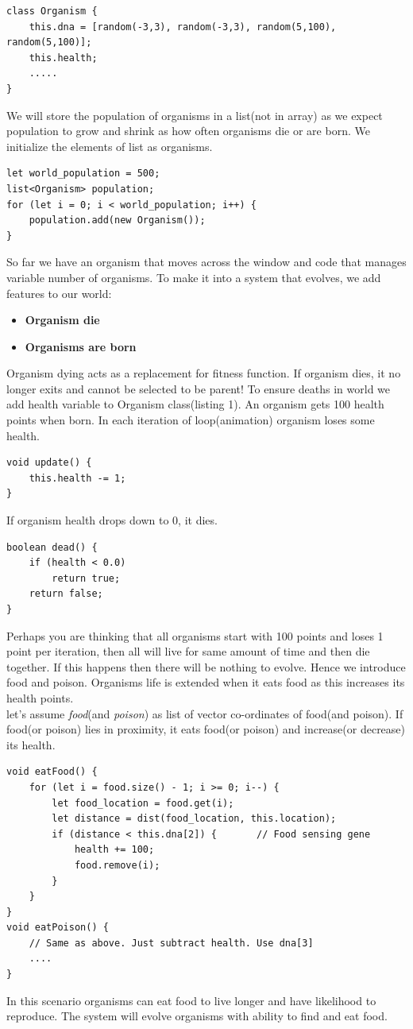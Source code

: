 \documentclass[conference]{IEEEtran}
\begin{document}
\begin{lstlisting}[caption = DNA of Organism]
class Organism {
	this.dna = [random(-3,3), random(-3,3), random(5,100), random(5,100)];
	this.health;
	.....
}
\end{lstlisting}
We will store the population of organisms in a list(not in array) as we expect population to grow and shrink as how often organisms die or are born. We initialize the elements of list as organisms.
\begin{lstlisting}[caption = Making initial population of organisms]
let world_population = 500;
list<Organism> population;
for (let i = 0; i < world_population; i++) {
	population.add(new Organism());
}
\end{lstlisting}
So far we have an organism that moves across the window and code that manages variable number of organisms. To make it into a system that evolves, we add features to our world:
\begin{itemize}
\item \textbf{Organism die}
\item \textbf{Organisms are born}
\end{itemize}
Organism dying acts as a replacement for fitness function. If organism dies, it no longer exits and cannot be selected to be parent! To ensure deaths in world we add health variable to Organism class(listing 1). An organism gets 100 health points when born. In each iteration of loop(animation) organism loses some health.
\begin{lstlisting}[caption = Updating death variable]
void update() {
	this.health -= 1;
}
\end{lstlisting}
If organism health drops down to 0, it dies.
\begin{lstlisting}[caption = Function in organism class to test if dead or not]
boolean dead() {
	if (health < 0.0) 
		return true;	
	return false;
}
\end{lstlisting}
Perhaps you are thinking that all organisms start with 100 points and loses 1 point per iteration, then all will live for same amount of time and then die together. If this happens then there will be nothing to evolve. Hence we introduce food and poison. Organisms life is extended when it eats food as this increases its health points.\\
let's assume \textit{food}(and \textit{poison}) as list of vector co-ordinates of food(and poison). If food(or poison) lies in proximity, it eats food(or poison) and increase(or decrease) its health.
\begin{lstlisting}[caption = Eating food and poison]
void eatFood() {
	for (let i = food.size() - 1; i >= 0; i--) {
		let food_location = food.get(i);
		let	distance = dist(food_location, this.location);
		if (distance < this.dna[2]) {		// Food sensing gene
			health += 100;
			food.remove(i);
		}
	}
}
void eatPoison() {
	// Same as above. Just subtract health. Use dna[3]
	....
}
\end{lstlisting}
In this scenario organisms can eat food to live longer and have likelihood to reproduce. The system will evolve organisms with ability to find and eat food.
\end{document}
